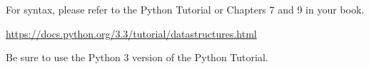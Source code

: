 \documentclass[11pt]{cselabheader}
\begin{document}
For syntax, please refer to the Python Tutorial or Chapters 7 and 9 in your
book.
\begin{center}
  \url{https://docs.python.org/3.3/tutorial/datastructures.html}
\end{center}
Be sure to use the Python 3 version of the Python Tutorial.



%
%
%
%
%
%
%
%
%
\end{document}
